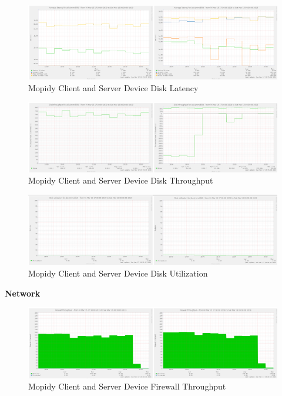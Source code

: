 \documentclass[11pt,a4paper,headinclude=false,footinclude=false]{scrreprt}
\begin{document}
\begin{figure}[H]
\includegraphics{ResultsAndAnalysis/MopidyServerTestImages/006MopidyDiskLatency.png}
\centering
\caption{Mopidy Client and Server Device Disk Latency}
\label{MopidyDiskLatency}
\end{figure}

\begin{figure}[H]
\includegraphics{ResultsAndAnalysis/MopidyServerTestImages/007MopidyDiskThroughput.png}
\centering
\caption{Mopidy Client and Server Device Disk Throughput}
\label{MopidyDiskThroughput}
\end{figure}

\begin{figure}[H]
\includegraphics{ResultsAndAnalysis/MopidyServerTestImages/009MopidyDiskUtilization.png}
\centering
\caption{Mopidy Client and Server Device Disk Utilization}
\label{MopidyDiskUtil}
\end{figure}

\textbf{Network}

\begin{figure}[H]
\includegraphics{ResultsAndAnalysis/MopidyServerTestImages/012MopidyFirewallThroughput.png}
\centering
\caption{Mopidy Client and Server Device Firewall Throughput}
\label{MopidyFirewallThroughput}
\end{figure}
\end{document}
